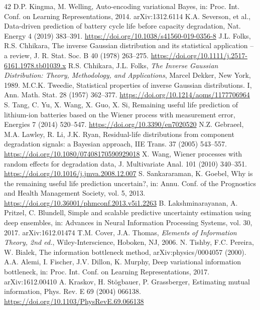 \begin{thebibliography}{42}
 D.P. Kingma, M. Welling, Auto-encoding variational Bayes, in: Proc. Int. Conf. on Learning Representations, 2014. arXiv:1312.6114
 K.A. Severson, et al., Data-driven prediction of battery cycle life before capacity degradation, Nat. Energy 4 (2019) 383--391. \url{https://doi.org/10.1038/s41560-019-0356-8}
 J.L. Folks, R.S. Chhikara, The inverse Gaussian distribution and its statistical application -- a review, J. R. Stat. Soc. B 40 (1978) 263--275. \url{https://doi.org/10.1111/j.2517-6161.1978.tb01039.x}
 R.S. Chhikara, J.L. Folks, {\it The Inverse Gaussian Distribution: Theory, Methodology, and Applications}, Marcel Dekker, New York, 1989.
 M.C.K. Tweedie, Statistical properties of inverse Gaussian distributions. I, Ann. Math. Stat. 28 (1957) 362--377. \url{https://doi.org/10.1214/aoms/1177706964}
 S. Tang, C. Yu, X. Wang, X. Guo, X. Si, Remaining useful life prediction of lithium-ion batteries based on the Wiener process with measurement error, Energies 7 (2014) 520--547. \url{https://doi.org/10.3390/en7020520}
 N.Z. Gebraeel, M.A. Lawley, R. Li, J.K. Ryan, Residual-life distributions from component degradation signals: a Bayesian approach, IIE Trans. 37 (2005) 543--557. \url{https://doi.org/10.1080/07408170590929018}
 X. Wang, Wiener processes with random effects for degradation data, J. Multivariate Anal. 101 (2010) 340--351. \url{https://doi.org/10.1016/j.jmva.2008.12.007}
 S. Sankararaman, K. Goebel, Why is the remaining useful life prediction uncertain?, in: Annu. Conf. of the Prognostics and Health Management Society, vol. 5, 2013. \url{https://doi.org/10.36001/phmconf.2013.v5i1.2263}
 B. Lakshminarayanan, A. Pritzel, C. Blundell, Simple and scalable predictive uncertainty estimation using deep ensembles, in: Advances in Neural Information Processing Systems, vol. 30, 2017. arXiv:1612.01474
 T.M. Cover, J.A. Thomas, {\it Elements of Information Theory, 2nd ed.}, Wiley-Interscience, Hoboken, NJ, 2006.
 N. Tishby, F.C. Pereira, W. Bialek, The information bottleneck method, arXiv:physics/0004057 (2000).
 A.A. Alemi, I. Fischer, J.V. Dillon, K. Murphy, Deep variational information bottleneck, in: Proc. Int. Conf. on Learning Representations, 2017. arXiv:1612.00410
 A. Kraskov, H. St\"ogbauer, P. Grassberger, Estimating mutual information, Phys. Rev. E 69 (2004) 066138. \url{https://doi.org/10.1103/PhysRevE.69.066138}

\end{thebibliography}
